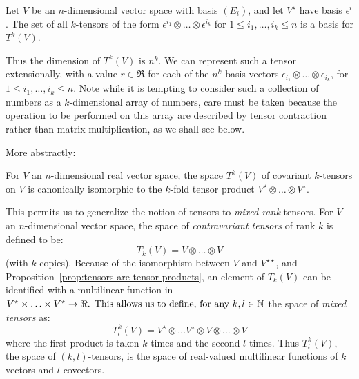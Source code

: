 \begin{proposition} Let \(V\) be an \(n\)-dimensional vector space with basis \((E_i)\), and let \(V^{\star}\) have basis \(\epsilon^i\). The set of all \(k\)-tensors of the form \(\epsilon^{i_1}\otimes \ldots \otimes\epsilon^{i_k}\) for \(1 \leq i_1, \ldots, i_k \leq n\) is a basis for \(T^k(V)\).
\end{proposition}

Thus the dimension of \(T^k(V)\) is \(n^k\). We can represent such a tensor extensionally, with a value $r\in \Re$ for each of the \(n^k\) basis vectors \(\epsilon_{i_1} \otimes \ldots \otimes \epsilon_{i_k}\), for \(1 \leq i_1, \ldots, i_k \leq n\). Note while it is tempting to consider such a collection of numbers as a \(k\)-dimensional array of numbers, care must be taken because the operation to be performed on this array are described by tensor contraction rather than matrix multiplication, as we shall see below. 


More abstractly:
\begin{proposition}\label{prop:tensors-are-tensor-products} For \(V\) an \(n\)-dimensional real vector space, the space \(T^k(V)\) of covariant \(k\)-tensors on \(V\) is canonically isomorphic to the \(k\)-fold tensor product \(V^{\star}\otimes \ldots \otimes V^{\star}\). 
\end{proposition}


This permits us to generalize the notion of tensors to {\em mixed rank} tensors. For \(V\) an \(n\)-dimensional vector space, the space of {\em contravariant tensors} of rank \(k\) is defined to be:
\[
T_k(V) = V \otimes \ldots \otimes V \]
(with \(k\) copies). Because of the isomorphism between \(V\) and \(V^{\star\star}\), and Proposition~\ref{prop:tensors-are-tensor-products}, an element of \(T_k(V)\) can be identified with a multilinear function in \(V^{\star} \times \ldots \times V^{\star} \rightarrow \Re$. This allows us to define, for any \(k, l \in \mathbb{N}\) the space of {\em mixed tensors} as:
\[T^k_l(V) = V^{\star}\otimes \ldots V^{\star}\otimes V\otimes \ldots \otimes V\]
\noindent where the first product is taken \(k\) times and the second \(l\) times.  Thus \(T^k_l(V)\), the space of \((k,l)\)-tensors, is the space of real-valued multilinear functions of \(k\) vectors and \(l\) covectors. 

